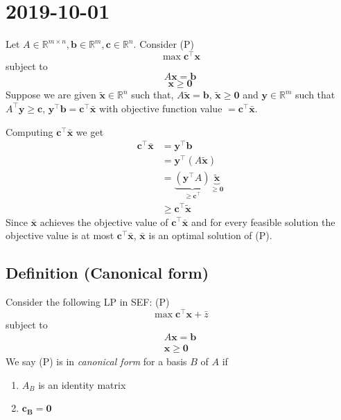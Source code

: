 \section{2019-10-01}
Let $A\in \mathbb{R}^{m\times n}, \bm{b}\in\mathbb{R}^m, \bm{c}\in\mathbb{R}^n$.
Consider (P)
\[\max \bm{c}^\top \bm{x}\]
subject to
\[ A\bm{x}=\bm{b} \]
\[ \bm{x}\ge\bm{0} \]
Suppose we are given
$\bm{\tilde{x}}\in\mathbb{R}^n$ such that, $A\bm{\tilde{x}}=\bm{b}$,
$\bm{\tilde{x}}\ge\bm{0}$
and
$\bm{y}\in\mathbb{R}^m$ such that $A^\top \bm{y}\ge\bm{c}$,
$\bm{y}^\top \bm{b}=\bm{c}^\top \bm{\bar{x}}$ with objective function
value $=\bm{c}^\top \bm{\bar{x}}$.


Computing $\bm{c}^\top \bm{\bar{x}}$ we get
\begin{align*}
    \bm{c}^\top \bm{\bar{x}}&=\bm{y}^\top \bm{b}\\
    &=\bm{y}^\top (A\bm{\tilde{x}})\\
    &=
    \underbrace{(\bm{y}^\top A)}_{\ge \bm{c}^\top }
    \underbrace{\bm{\tilde{x}}}_{\ge \bm{0}}\\
    &\ge \bm{c}^\top \bm{\tilde{x}}
\end{align*}
Since $\bm{\bar{x}}$ achieves the objective value of 
$\bm{c}^\top \bm{\bar{x}}$ and for every feasible solution the objective
value is at most $\bm{c}^\top \bm{\bar{x}}$, $\bm{\bar{x}}$ is an
optimal solution of (P).


\begin{defbox}
    \subsection{Definition (Canonical form)}
    Consider the following LP in SEF: (P)
    \[\max \bm{c}^\top  \bm{x}+\bar{z}\]
    subject to
    \begin{align*}
        A\bm{x}=\bm{b}\\
        \bm{x}\ge \bm{0}
    \end{align*}
    We say (P) is in \emph{canonical form} for a basis $B$ of $A$ if
    \begin{enumerate}[(C1)]
        \item $A_B$ is an identity matrix
        \item $\bm{c_B}=\bm{0}$
    \end{enumerate}
\end{defbox}

